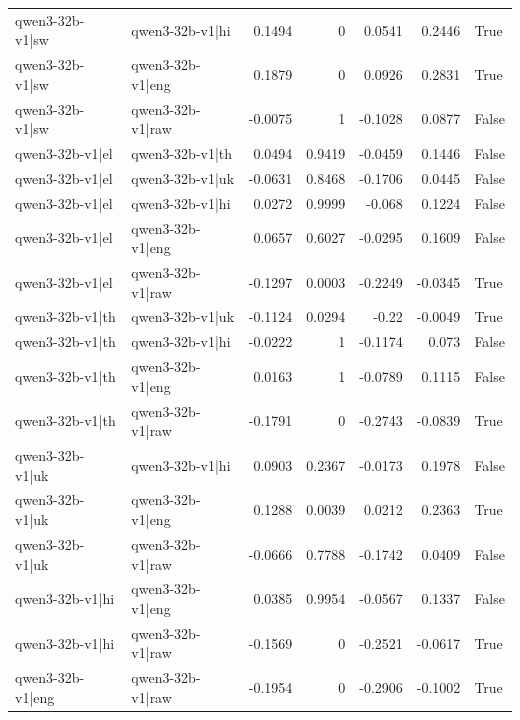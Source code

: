 \begin{table}
\begin{tabular}{l l r r r r l}
qwen3-32b-v1|sw & qwen3-32b-v1|hi & 0.1494 & 0 & 0.0541 & 0.2446 & True \\
qwen3-32b-v1|sw & qwen3-32b-v1|eng & 0.1879 & 0 & 0.0926 & 0.2831 & True \\
qwen3-32b-v1|sw & qwen3-32b-v1|raw & -0.0075 & 1 & -0.1028 & 0.0877 & False \\
qwen3-32b-v1|el & qwen3-32b-v1|th & 0.0494 & 0.9419 & -0.0459 & 0.1446 & False \\
qwen3-32b-v1|el & qwen3-32b-v1|uk & -0.0631 & 0.8468 & -0.1706 & 0.0445 & False \\
qwen3-32b-v1|el & qwen3-32b-v1|hi & 0.0272 & 0.9999 & -0.068 & 0.1224 & False \\
qwen3-32b-v1|el & qwen3-32b-v1|eng & 0.0657 & 0.6027 & -0.0295 & 0.1609 & False \\
qwen3-32b-v1|el & qwen3-32b-v1|raw & -0.1297 & 0.0003 & -0.2249 & -0.0345 & True \\
qwen3-32b-v1|th & qwen3-32b-v1|uk & -0.1124 & 0.0294 & -0.22 & -0.0049 & True \\
qwen3-32b-v1|th & qwen3-32b-v1|hi & -0.0222 & 1 & -0.1174 & 0.073 & False \\
qwen3-32b-v1|th & qwen3-32b-v1|eng & 0.0163 & 1 & -0.0789 & 0.1115 & False \\
qwen3-32b-v1|th & qwen3-32b-v1|raw & -0.1791 & 0 & -0.2743 & -0.0839 & True \\
qwen3-32b-v1|uk & qwen3-32b-v1|hi & 0.0903 & 0.2367 & -0.0173 & 0.1978 & False \\
qwen3-32b-v1|uk & qwen3-32b-v1|eng & 0.1288 & 0.0039 & 0.0212 & 0.2363 & True \\
qwen3-32b-v1|uk & qwen3-32b-v1|raw & -0.0666 & 0.7788 & -0.1742 & 0.0409 & False \\
qwen3-32b-v1|hi & qwen3-32b-v1|eng & 0.0385 & 0.9954 & -0.0567 & 0.1337 & False \\
qwen3-32b-v1|hi & qwen3-32b-v1|raw & -0.1569 & 0 & -0.2521 & -0.0617 & True \\
qwen3-32b-v1|eng & qwen3-32b-v1|raw & -0.1954 & 0 & -0.2906 & -0.1002 & True \\
\bottomrule
\end{tabular}
\end{table}
